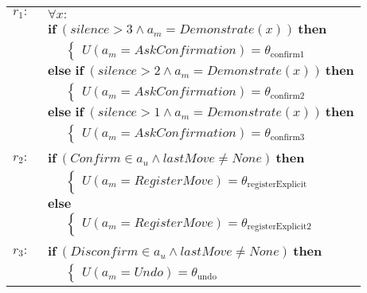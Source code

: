 \begin{footnotesize}
\begin{longtable}{p{1cm}l} 
$r_{1}: \ \ $ &  $\forall x : $ \\ & $\textbf{if} \ (\mathit{silence}\!>\!\mathit{3} \land \mathit{a_m}\!=\!\mathit{Demonstrate}(x)) \ \textbf{then}$ \\
& $\;\;\;\;\; \begin{cases}U(\mathit{a_m}\!=\!\mathit{AskConfirmation})\!=\!\theta_{\mathrm{confirm1}}\end{cases}$ \\ 
& $\textbf{else if} \ (\mathit{silence}\!>\!\mathit{2} \land \mathit{a_m}\!=\!\mathit{Demonstrate}(x)) \ \textbf{then}$ \\
& $\;\;\;\;\; \begin{cases}U(\mathit{a_m}\!=\!\mathit{AskConfirmation})\!=\!\theta_{\mathrm{confirm2}}\end{cases}$ \\ 
& $\textbf{else if} \ (\mathit{silence}\!>\!\mathit{1} \land \mathit{a_m}\!=\!\mathit{Demonstrate}(x)) \ \textbf{then}$ \\
& $\;\;\;\;\; \begin{cases}U(\mathit{a_m}\!=\!\mathit{AskConfirmation})\!=\!\theta_{\mathrm{confirm3}}\end{cases}$ \\ \\[-1mm]
$r_{2}: \ \ $ & $\textbf{if} \ (\mathit{Confirm}\!\in\!\mathit{a_u} \land \mathit{lastMove}\!\neq\!\mathit{None}) \ \textbf{then}$ \\
& $\;\;\;\;\; \begin{cases}U(\mathit{a_m}\!=\!\mathit{RegisterMove})\!=\!\theta_{\mathrm{registerExplicit}}\end{cases}$\\ 
& $\textbf{else}$ \\
& $\;\;\;\;\; \begin{cases}U(\mathit{a_m}\!=\!\mathit{RegisterMove})\!=\!\theta_{\mathrm{registerExplicit2}}\end{cases}$ \\ \\[-1mm] 
$r_{3}: \ \ $& $\textbf{if} \ (\mathit{Disconfirm}\!\in\!\mathit{a_u} \land \mathit{lastMove}\!\neq\!\mathit{None}) \ \textbf{then}$ \\
& $\;\;\;\;\; \begin{cases}U(\mathit{a_m}\!=\!\mathit{Undo})\!=\!\theta_{\mathrm{undo}}\end{cases}$ \\ 

\end{longtable}
\end{footnotesize}
